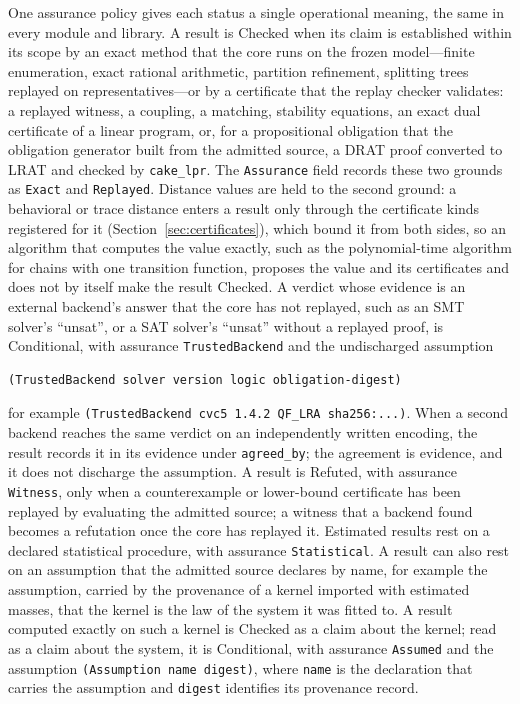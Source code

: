 \documentclass[11pt]{article}
\newcommand{\code}[1]{\texttt{#1}}
\theoremstyle{definition}
\theoremstyle{plain}
\begin{document}
One assurance policy gives each status a single operational meaning, the same in every module and
library. A result is Checked when its claim is established within its scope by an exact method that
the core runs on the frozen model---finite enumeration, exact rational arithmetic, partition
refinement, splitting trees replayed on representatives---or by a certificate that the replay
checker validates: a replayed witness, a coupling, a matching, stability equations, an exact dual
certificate of a linear program, or, for a propositional obligation that the obligation generator
built from the admitted source, a DRAT proof converted to LRAT and checked by \code{cake\_lpr}. The
\code{Assurance} field records these two grounds as \code{Exact} and \code{Replayed}. Distance values
are held to the second ground: a behavioral or trace distance enters a result only through the
certificate kinds registered for it (Section~\ref{sec:certificates}), which bound it from both sides,
so an algorithm that computes the value exactly, such as the polynomial-time algorithm for chains with
one transition function, proposes the value and its certificates and does not by itself make the
result Checked. A verdict whose
evidence is an external backend's answer that the core has not replayed, such as an SMT solver's
``unsat'', or a SAT solver's ``unsat'' without a replayed proof, is Conditional, with assurance
\code{TrustedBackend} and the undischarged assumption
\begin{lstlisting}
(TrustedBackend solver version logic obligation-digest)
\end{lstlisting}
for example \code{(TrustedBackend cvc5 1.4.2 QF\_LRA sha256:...)}. When a second backend reaches the
same verdict on an independently written encoding, the result records it in its evidence under
\code{agreed\_by}; the agreement is evidence, and it does not discharge the assumption. A result is
Refuted, with assurance \code{Witness}, only when a counterexample or lower-bound certificate has
been replayed by evaluating the admitted source; a witness that a backend found becomes a
refutation once the core has replayed it. Estimated results rest on a declared statistical
procedure, with assurance \code{Statistical}. A result can also rest on an assumption that the
admitted source declares by name, for example the assumption, carried by the provenance of a kernel
imported with estimated masses, that the kernel is the law of the system it was fitted to. A result
computed exactly on such a kernel is Checked as a claim about the kernel; read as a claim about the
system, it is Conditional, with assurance \code{Assumed} and the assumption
\code{(Assumption name digest)}, where \code{name} is the declaration that carries the assumption and
\code{digest} identifies its provenance record.
\end{document}
